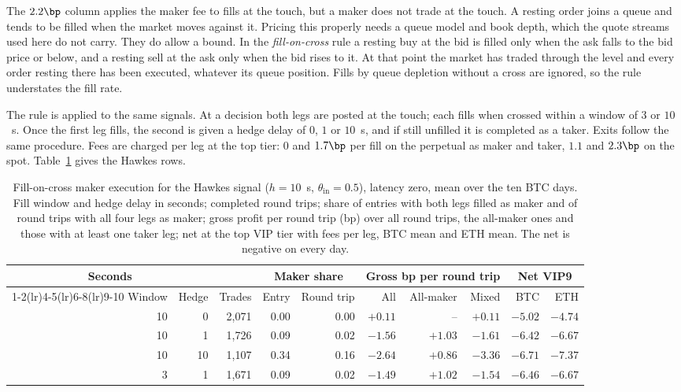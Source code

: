 \documentclass[a4paper,11pt]{article}
\begin{document}
The $2.2\bp$ column applies the maker fee to fills at the touch, but a maker does not trade at the touch. A resting order joins a queue and tends to be filled when the market moves against it. Pricing this properly needs a queue model and book depth, which the quote streams used here do not carry. They do allow a bound. In the \emph{fill-on-cross} rule a resting buy at the bid is filled only when the ask falls to the bid price or below, and a resting sell at the ask only when the bid rises to it. At that point the market has traded through the level and every order resting there has been executed, whatever its queue position. Fills by queue depletion without a cross are ignored, so the rule understates the fill rate.

The rule is applied to the same signals. At a decision both legs are posted at the touch; each fills when crossed within a window of $3$ or $10$~s. Once the first leg fills, the second is given a hedge delay of $0$, $1$ or $10$~s, and if still unfilled it is completed as a taker. Exits follow the same procedure. Fees are charged per leg at the top tier: $0$ and $1.7\bp$ per fill on the perpetual as maker and taker, $1.1$ and $2.3\bp$ on the spot. Table~\ref{tab:maker} gives the Hawkes rows.

\begin{table}[!htb]
\centering
\caption{Fill-on-cross maker execution for the Hawkes signal ($h = 10$~s, $\theta_{\mathrm{in}} = 0.5$), latency zero, mean over the ten BTC days. Fill window and hedge delay in seconds; completed round trips; share of entries with both legs filled as maker and of round trips with all four legs as maker; gross profit per round trip (bp) over all round trips, the all-maker ones and those with at least one taker leg; net at the top VIP tier with fees per leg, BTC mean and ETH mean. The net is negative on every day.}
\label{tab:maker}
\footnotesize
\setlength{\tabcolsep}{4pt}
\begin{tabular}{@{}rrrrrrrrrr@{}}
\toprule
\multicolumn{2}{c}{Seconds} & & \multicolumn{2}{c}{Maker share} & \multicolumn{3}{c}{Gross bp per round trip} & \multicolumn{2}{c}{Net VIP9} \\
\cmidrule(lr){1-2}\cmidrule(lr){4-5}\cmidrule(lr){6-8}\cmidrule(lr){9-10}
Window & Hedge & Trades & Entry & Round trip & All & All-maker & Mixed & BTC & ETH \\
\midrule
10 & 0 & 2,071 & 0.00 & 0.00 & $+0.11$ & -- & $+0.11$ & $-5.02$ & $-4.74$ \\
10 & 1 & 1,726 & 0.09 & 0.02 & $-1.56$ & $+1.03$ & $-1.61$ & $-6.42$ & $-6.67$ \\
10 & 10 & 1,107 & 0.34 & 0.16 & $-2.64$ & $+0.86$ & $-3.36$ & $-6.71$ & $-7.37$ \\
3 & 1 & 1,671 & 0.09 & 0.02 & $-1.49$ & $+1.02$ & $-1.54$ & $-6.46$ & $-6.67$ \\
\bottomrule
\end{tabular}
\end{table}
\end{document}
